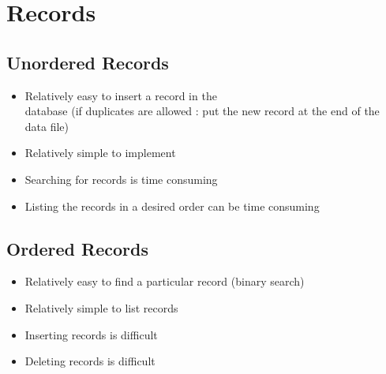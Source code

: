 \section{Records}

\subsection{Unordered Records}

\begin{minipage}[t]{0.48\textwidth}
\begin{itemize}
    \item Relatively easy to insert a record in the\\ database (if duplicates are allowed : put the new record at the end of the data file)
    \item Relatively simple to implement
\end{itemize}
\end{minipage}
\hfill
\begin{minipage}[t]{0.48\textwidth}
\begin{itemize}
    \item Searching for records is time consuming
    \item Listing the records in a desired order can be time consuming
\end{itemize}
\end{minipage}

\subsection{Ordered Records}

\begin{minipage}[t]{0.48\textwidth}
\begin{itemize}
    \item Relatively easy to find a particular record (binary search)
    \item Relatively simple to list records
\end{itemize}
\end{minipage}
\hfill
\begin{minipage}[t]{0.48\textwidth}
\begin{itemize}
    \item Inserting records is difficult
    \item Deleting records is difficult
\end{itemize}
\end{minipage}

